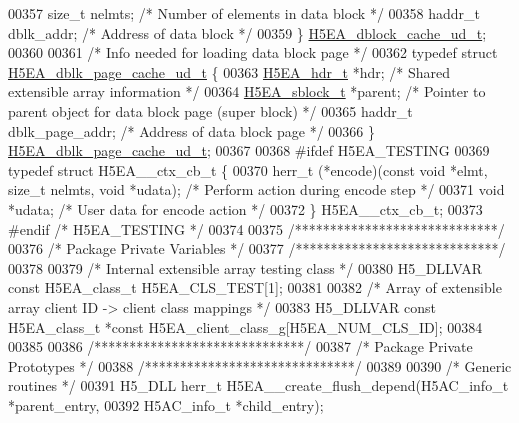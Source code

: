 \begin{DoxyCode}
00357     \textcolor{keywordtype}{size\_t} nelmts;              \textcolor{comment}{/* Number of elements in data block */}
00358     haddr\_t dblk\_addr;          \textcolor{comment}{/* Address of data block */}
00359 \} \hyperlink{struct_h5_e_a__dblock__cache__ud__t}{H5EA\_dblock\_cache\_ud\_t};
00360 
00361 \textcolor{comment}{/* Info needed for loading data block page */}
00362 \textcolor{keyword}{typedef} \textcolor{keyword}{struct }\hyperlink{struct_h5_e_a__dblk__page__cache__ud__t}{H5EA\_dblk\_page\_cache\_ud\_t} \{
00363     \hyperlink{struct_h5_e_a__hdr__t}{H5EA\_hdr\_t}    *hdr;         \textcolor{comment}{/* Shared extensible array information */}
00364     \hyperlink{struct_h5_e_a__sblock__t}{H5EA\_sblock\_t} *parent;      \textcolor{comment}{/* Pointer to parent object for data block page (super block) 
      */}
00365     haddr\_t dblk\_page\_addr;     \textcolor{comment}{/* Address of data block page */}
00366 \} \hyperlink{struct_h5_e_a__dblk__page__cache__ud__t}{H5EA\_dblk\_page\_cache\_ud\_t};
00367 
00368 \textcolor{preprocessor}{#ifdef H5EA\_TESTING}
00369 \textcolor{keyword}{typedef} \textcolor{keyword}{struct }H5EA\_\_ctx\_cb\_t \{
00370     herr\_t (*encode)(\textcolor{keyword}{const} \textcolor{keywordtype}{void} *elmt, \textcolor{keywordtype}{size\_t} nelmts, \textcolor{keywordtype}{void} *udata);   \textcolor{comment}{/* Perform action during encode step 
      */}
00371     \textcolor{keywordtype}{void} *udata;                \textcolor{comment}{/* User data for encode action */}
00372 \} H5EA\_\_ctx\_cb\_t;
00373 \textcolor{preprocessor}{#endif }\textcolor{comment}{/* H5EA\_TESTING */}\textcolor{preprocessor}{}
00374 
00375 \textcolor{comment}{/*****************************/}
00376 \textcolor{comment}{/* Package Private Variables */}
00377 \textcolor{comment}{/*****************************/}
00378 
00379 \textcolor{comment}{/* Internal extensible array testing class */}
00380 H5\_DLLVAR \textcolor{keyword}{const} H5EA\_class\_t H5EA\_CLS\_TEST[1];
00381 
00382 \textcolor{comment}{/* Array of extensible array client ID -> client class mappings */}
00383 H5\_DLLVAR \textcolor{keyword}{const} H5EA\_class\_t *\textcolor{keyword}{const} H5EA\_client\_class\_g[H5EA\_NUM\_CLS\_ID];
00384 
00385 
00386 \textcolor{comment}{/******************************/}
00387 \textcolor{comment}{/* Package Private Prototypes */}
00388 \textcolor{comment}{/******************************/}
00389 
00390 \textcolor{comment}{/* Generic routines */}
00391 H5\_DLL herr\_t H5EA\_\_create\_flush\_depend(H5AC\_info\_t *parent\_entry,
00392     H5AC\_info\_t *child\_entry);

\end{DoxyCode}
